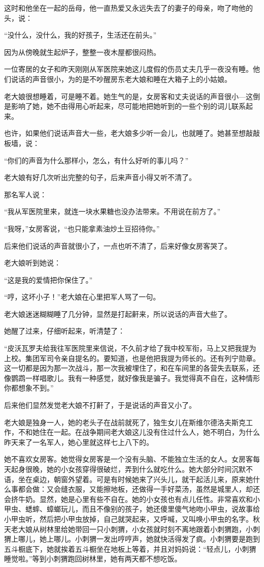这时和他坐在一起的岳母，他一直热爱又永远失去了的妻子的母亲，吻了吻他的头，说：

“没什么，没什么，我的好孩子，生活还在前头。”

因为从傍晚就生起炉子，整整一夜木屋都很闷热。

一位寄居的女子和昨天刚刚从军医院来她这儿度假的伤员丈夫几乎一夜没有睡。他们说话的声音很小，为的是不吵醒房东老大娘和睡在大箱子上的小姑娘。

老大娘很想睡着，可是睡不着。她生气的是，女房客和丈夫说话的声音很小—这倒是影响了她，她不由得用心听起来，尽可能地把她听到的一些个别的词儿联系起来。

也许，如果他们说话声音大一些，老大娘多少听一会儿，也就睡了。她甚至想敲敲板墙，说：

“你们的声音为什么那样小，怎么，有什么好听的事儿吗？”

老大娘有好几次听出完整的句子，后来声音小得又听不清了。

那名军人说：

“我从军医院里来，就连一块水果糖也没办法带来。不用说在前方了。”

“我呀，”女房客说，“也只能拿素油炒土豆招待你。”

后来他们说话的声音就很小了，一点也听不清了，后来好像女房客哭了。

老大娘听到她说：

“这是我的爱情把你保住了。”

“哼，这坏小子！”老大娘在心里把军人骂了一句。

老大娘迷迷糊糊睡了几分钟，显然是打起鼾来，所以说话的声音大些了。

她醒了过来，仔细听起来，听清楚了：

“皮沃瓦罗夫给我往军医院里来信说，不久前才给了我中校军衔，马上又把我提为上校。集团军司令亲自提名的。要知道，也是他把我提为师长的。还有列宁勋章。这一切都是因为那一次战斗，那一次我被埋住了，和在车间里的各营失去联系，还像鹦鹉一样唱歌儿。我有一种感觉，就好像我是骗子。我觉得真不自在，这种情形你都想象不到。”

后来他们显然发觉老大娘不打鼾了，于是说话的声音又小了。

老大娘是独身一人，她的老头子在战前就死了，独生女儿在斯维尔德洛夫斯克工作，不和她住在一起。在战争期间老大娘这儿没有住过什么人，她不明白，为什么昨天来了一名军人，她心里就这样七上八下的。

她不喜欢女房客。她觉得女房客是一个没有头脑、不能独立生活的女人。女房客每天起身很晚，她的小女孩穿得很破烂，弄到什么就吃什么。她大部分时间沉默不语，坐在桌边，朝窗外望着。可是有时候她来了兴头儿，就干起活儿来，原来她什么事都会做：又会缝衣服，又能擦地板，还做得一手好菜汤，虽然是城里人，却还会挤牛奶。显然，她是心里有些不自在。她的小女孩也有点儿任性。非常喜欢和小甲虫、蟋蟀、蟑螂玩儿，而且不像别的孩子，她还傻里傻气地吻小甲虫，说故事给小甲虫听，然后把小甲虫放掉，自己就哭起来，又呼喊，又叫唤小甲虫的名字。秋天老大娘从树林里给她带回一只小刺猬，小女孩就时刻不离地跟着小刺猬跑，小刺猬上哪儿，她上哪儿。小刺猬一发出哼哼声，她就快活得发了疯。小刺猬要是跑到五斗橱底下，她就挨着五斗橱坐在地板上等着，并且对妈妈说：“轻点儿，小刺猬睡觉啦。”等到小刺猬跑回树林里，她有两天都不想吃饭。


